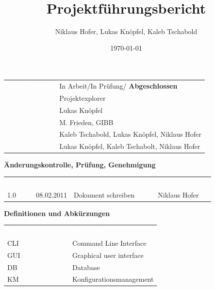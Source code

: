 \documentclass[10pt,paper=a4,final]{scrartcl}
\title{Projektf\"uhrungsbericht}
\author{Niklaus Hofer, Lukas Kn\"opfel, Kaleb Tschabold}
\date{\today}
\begin{document}
\maketitle
\newpage
\begin{tabularx}{\textwidth}{ r X }	%
  \textcolor{white}{{\bf Status}}\cellcolor{blue!80!} & In Arbeit/In Prüfung/ {\bf Abgeschlossen}\cellcolor{blue!20!} \\
\textcolor{white}{{\bf Projektname}}\cellcolor{blue!80!} & Projektexplorer\cellcolor{blue!20!} \\
\textcolor{white}{{\bf Projektleiter}}\cellcolor{blue!80!} & Lukas Kn\"opfel\cellcolor{blue!20!} \\
\textcolor{white}{{\bf Auftraggeber}}\cellcolor{blue!80!} & M. Frieden, GIBB\cellcolor{blue!20!} \\
\textcolor{white}{{\bf Autoren}}\cellcolor{blue!80!} & Kaleb Tschabold, Lukas Kn\"opfel, Niklaus Hofer\cellcolor{blue!20!} \\
\textcolor{white}{{\bf Verteiler}}\cellcolor{blue!80!} & Lukas Knöpfel, Kaleb Tschabolt, Niklaus Hofer\cellcolor{blue!20!}
\end{tabularx}
\newline
\newline
\newline
{\bf Änderungskontrolle, Prüfung, Genehmigung}
\newline

\begin{tabularx}{\textwidth}{l l X X}
\textcolor{white}{Version}\cellcolor{blue!80!} & \textcolor{white}{Datum}\cellcolor{blue!80!} & \textcolor{white}{Beschreibung, Bemerkung}\cellcolor{blue!80!} & \textcolor{white}{Name oder Rolle}\cellcolor{blue!80!} \\
\cellcolor{blue!20!} 1.0& \cellcolor{blue!20!} 08.02.2011 & Dokument schreiben \cellcolor{blue!20!} & Niklaus Hofer \cellcolor{blue!20!} \\
\end{tabularx}
\newline
\newline
\newline
{\bf Definitionen und Abkürzungen}
\newline

\begin{tabularx}{\textwidth}{l X}
\textcolor{white}{Begriff/ Abkürzung}\cellcolor{blue!80!} & \textcolor{white}{Bedeutung}\cellcolor{blue!80!} \\
CLI \cellcolor{blue!20!} & Command Line Interface\cellcolor{blue!20!} \\
GUI \cellcolor{blue!20!} & Graphical user interface \cellcolor{blue!20!} \\
DB \cellcolor{blue!20!} & Database\cellcolor{blue!20!} \\
KM \cellcolor{blue!20!} & Konfigurationsmanagement \cellcolor{blue!20!} \\
\end{tabularx}
\newline
\newline
\newline

{}
\flushleft
\newpage
\tableofcontents
\newpage
\end{document}
